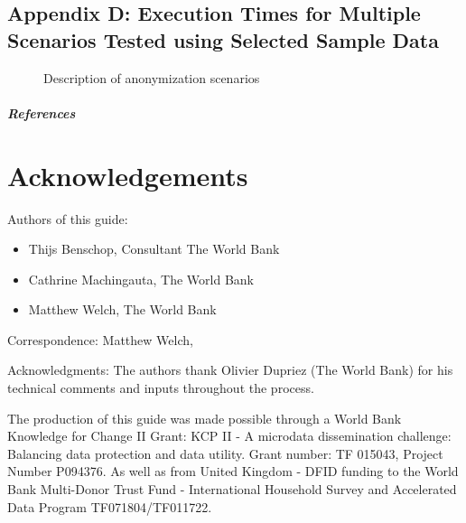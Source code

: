 \documentclass[letterpaper,10pt,english]{sphinxmanual}
\begin{document}
\section{Appendix D: Execution Times for Multiple Scenarios Tested using Selected Sample Data}
\label{\detokenize{appendices:appendix-d-execution-times-for-multiple-scenarios-tested-using-selected-sample-data}}
\begin{figure}[htbp]
\centering

\noindent{}
\end{figure}

\begin{figure}[htbp]
\centering
\capstart

\noindent{}
\caption{Description of anonymization scenarios}\label{\detokenize{appendices:id1}}\end{figure}
\paragraph{References}


\chapter{Acknowledgements}
\label{\detokenize{acknowledgements:acknowledgements}}\label{\detokenize{acknowledgements::doc}}
Authors of this guide:
\begin{itemize}
\item {} 
Thijs Benschop, Consultant The World Bank

\item {} 
Cathrine Machingauta, The World Bank

\item {} 
Matthew Welch, The World Bank

\end{itemize}

Correspondence: Matthew Welch, 

Acknowledgments: The authors thank Olivier Dupriez (The World Bank) for
his technical comments and inputs throughout the process.

The production of this guide was made possible through a World Bank
Knowledge for Change II Grant: KCP II - A microdata dissemination
challenge: Balancing data protection and data utility. Grant number: TF
015043, Project Number P094376. As well as from United Kingdom - DFID
funding to the World Bank Multi-Donor Trust Fund - International
Household Survey and Accelerated Data Program \textendash{} TF071804/TF011722.
\end{document}
